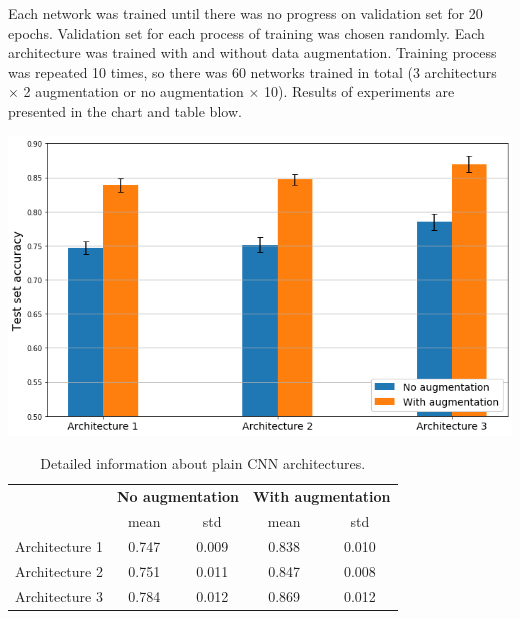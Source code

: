 \documentclass{article}
\begin{document}
Each network was trained until there was no progress on validation set for 20 epochs. Validation set for each process of training was chosen randomly. Each architecture was trained with and without data augmentation. Training process was repeated 10 times, so there was 60 networks trained in total (3 architecturs $\times$ 2 augmentation or no augmentation $\times$ 10). Results of experiments are presented in the chart and table blow. 

\begin{center}
\includegraphics[scale=0.6]{results_plain_cnn.png}
\end{center}

\begin{table}[h]
\centering
\begin{tabular}{r|cc|cc|}
\multicolumn{1}{l|}{} & \multicolumn{2}{l|}{\textbf{No augmentation}} & \multicolumn{2}{l|}{\textbf{With augmentation}} \\
\multicolumn{1}{l|}{} & mean                  & std                   & mean                   & std                    \\ \hline
Architecture 1        & 0.747               & 0.009              & 0.838                & 0.010               \\
Architecture 2        & 0.751               & 0.011              & 0.847                & 0.008               \\
Architecture 3        & 0.784               & 0.012              & 0.869                & 0.012               \\ \hline
\end{tabular}
\caption{Detailed information about plain CNN architectures.}
\label{architectures_info}
\end{table}
\end{document}
